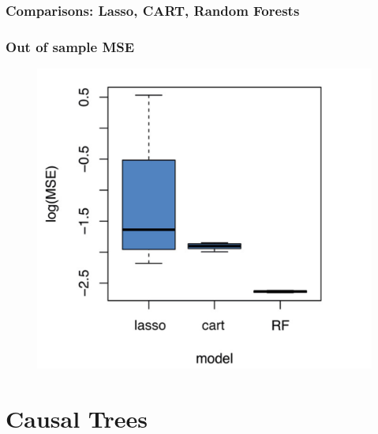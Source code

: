 \documentclass[
  shownotes,
  xcolor={svgnames},
  hyperref={colorlinks,citecolor=DarkBlue,linkcolor=DarkRed,urlcolor=DarkBlue}
  , aspectratio=169]{beamer}
\begin{document}
\begin{frame}[fragile]
\frametitle{Comparisons: Lasso, CART, Random Forests}
\frametitle{Out of sample MSE}


\begin{figure}[H] \centering
            \captionsetup{justification=centering}
              \includegraphics[scale=0.15]{figures/california_out_of_sample}
 \end{figure}

\end{frame}



\section{Causal Trees}
\end{document}
